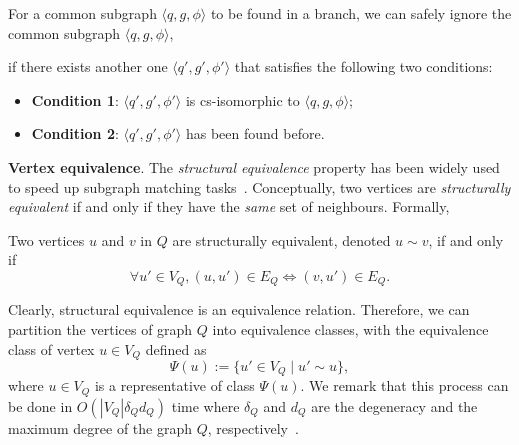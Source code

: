    
For a common subgraph $\langle q,g,\phi \rangle$ to be found in a branch, we can safely {\chengC ignore the common subgraph $\langle q,g,\phi \rangle$}, {\revision if there exists another one $\langle q',g',\phi' \rangle$ that satisfies the following two conditions:
\begin{itemize}
    \item \textbf{Condition 1}: $\langle q',g',\phi' \rangle$ is cs-isomorphic to $\langle q,g,\phi \rangle$;
    \item  \textbf{Condition 2}: $\langle q',g',\phi' \rangle$ has been found before.
\end{itemize}}


\smallskip
\noindent\textbf{Vertex equivalence}. 
{\chengC The \emph{structural equivalence} property}
has been widely used to speed up subgraph matching tasks~\cite{nguyen2019applications,yang2023structural,kim2021versatile}. Conceptually, two vertices are  \emph{structurally equivalent}  if and only if they have the \emph{same} set of neighbours. 
{\chengC Formally, }

\begin{definition}
    Two vertices $u$ and $v$ in $Q$ are structurally equivalent, denoted  $u\sim v$, if and only if  
    \begin{equation}
        \forall u'\in V_Q, (u,u')\in E_Q \Leftrightarrow (v,u')\in E_Q. 
    \end{equation}
\end{definition}

Clearly, structural equivalence is an equivalence relation. Therefore, we can partition the vertices of graph $Q$ into equivalence classes, with the equivalence class of vertex $u\in V_Q$ defined as 
\begin{equation}
    \Psi(u)  := \{u'\in V_Q \mid u'\sim u\},
\end{equation}
where $u\in V_Q$ is a representative of class $\Psi(u)$.
%
We remark that this process can be done in $O(|V_Q|\delta_Q d_Q)$ {\chengB time} where $\delta_Q$ and $d_Q$ are the degeneracy and the maximum degree of the graph $Q$, respectively~\cite{nguyen2019applications,yang2023structural,kim2021versatile}. 


